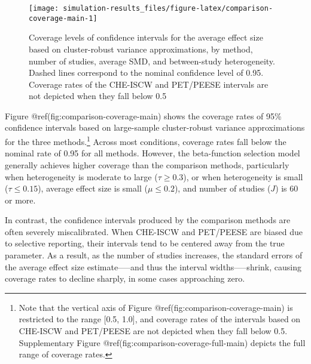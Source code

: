 \documentclass[
]{article}
\begin{document}
\begin{sidewaysfigure}
\texttt{[image: simulation-results\_files/figure-latex/comparison-coverage-main-1]} \caption{Coverage levels of confidence intervals for the average effect size based on cluster-robust variance approximations, by method, number of studies, average SMD, and between-study heterogeneity. Dashed lines correspond to the nominal confidence level of 0.95. Coverage rates of the CHE-ISCW and PET/PEESE intervals are not depicted when they fall below 0.5}\label{fig:comparison-coverage-main}
\end{sidewaysfigure}

Figure @ref(fig:comparison-coverage-main) shows the coverage rates of
95\% confidence intervals based on large-sample cluster-robust variance
approximations for the three methods.\footnote{Note that the vertical
  axis of Figure @ref(fig:comparison-coverage-main) is restricted to the
  range {[}0.5, 1.0{]}, and coverage rates of the intervals based on
  CHE-ISCW and PET/PEESE are not depicted when they fall below 0.5.
  Supplementary Figure @ref(fig:comparison-coverage-full-main) depicts
  the full range of coverage rates.} Across most conditions, coverage
rates fall below the nominal rate of 0.95 for all methods. However, the
beta-function selection model generally achieves higher coverage than
the comparison methods, particularly when heterogeneity is moderate to
large (\(\tau \geq 0.3\)), or when heterogeneity is small
(\(\tau \leq 0.15\)), average effect size is small (\(\mu \leq 0.2\)),
and number of studies (\(J\)) is 60 or more.

In contrast, the confidence intervals produced by the comparison methods
are often severely miscalibrated. When CHE-ISCW and PET/PEESE are biased
due to selective reporting, their intervals tend to be centered away
from the true parameter. As a result, as the number of studies
increases, the standard errors of the average effect size
estimate-----and thus the interval widths-----shrink, causing coverage
rates to decline sharply, in some cases approaching zero.
\end{document}
